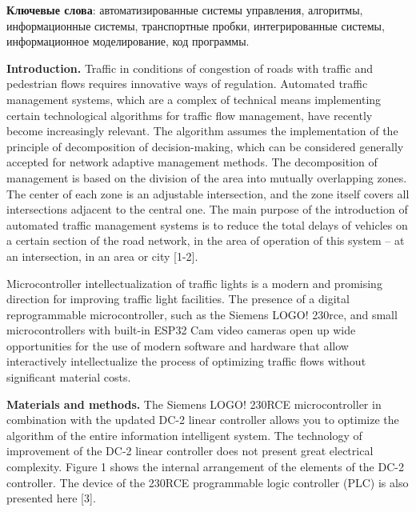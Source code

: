 {\bfseries Ключевые слова}: автоматизированные системы управления, алгоритмы,
информационные системы, транспортные пробки, интегрированные системы,
информационное моделирование, код программы.

\begin{multicols}{2}
{\bfseries Introduction.} Traffic in conditions of congestion of roads with
traffic and pedestrian flows requires innovative ways of regulation.
Automated traffic management systems, which are a complex of technical
means implementing certain technological algorithms for traffic flow
management, have recently become increasingly relevant. The algorithm
assumes the implementation of the principle of decomposition of
decision-making, which can be considered generally accepted for network
adaptive management methods. The decomposition of management is based on
the division of the area into mutually overlapping zones. The center of
each zone is an adjustable intersection, and the zone itself covers all
intersections adjacent to the central one. The main purpose of the
introduction of automated traffic management systems is to reduce the
total delays of vehicles on a certain section of the road network, in
the area of operation of this system -- at an intersection, in an area
or city {[}1-2{]}.

Microcontroller intellectualization of traffic lights is a modern and
promising direction for improving traffic light facilities. The presence
of a digital reprogrammable microcontroller, such as the Siemens LOGO!
230rce, and small microcontrollers with built-in ESP32 Cam video cameras
open up wide opportunities for the use of modern software and hardware
that allow interactively intellectualize the process of optimizing
traffic flows without significant material costs.

{\bfseries Materials and methods.} The Siemens LOGO! 230RCE microcontroller
in combination with the updated DC-2 linear controller allows you to
optimize the algorithm of the entire information intelligent system. The
technology of improvement of the DC-2 linear controller does not present
great electrical complexity. Figure 1 shows the internal arrangement of
the elements of the DC-2 controller. The device of the 230RCE
programmable logic controller (PLC) is also presented here {[}3{]}.
\end{multicols}

